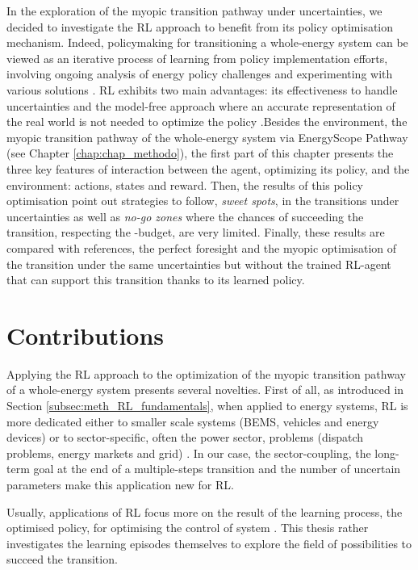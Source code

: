 In the exploration of the myopic transition pathway under uncertainties, we decided to investigate the \gls{RL} approach to benefit from its policy optimisation mechanism. Indeed, policymaking for transitioning a whole-energy system can be viewed as an iterative process of learning from policy implementation efforts, involving ongoing analysis of energy policy challenges and experimenting with various solutions \cite{howlett1995studying}. \gls{RL} exhibits two main advantages: its effectiveness to handle uncertainties and the model-free approach where an accurate representation of the real world is not needed to optimize the policy \cite{perera2021applications}.Besides the environment, \ie the myopic transition pathway of the whole-energy system via EnergyScope Pathway (see Chapter \ref{chap:chap_methodo}), the first part of this chapter presents the three key features of interaction between the agent, optimizing its policy, and the environment: actions, states and reward.  Then, the results of this policy optimisation point out strategies to follow, \ie \textit{sweet spots}, in the transitions under uncertainties as well as \textit{no-go zones} where the chances of succeeding the transition, \ie respecting the -budget, are very limited. Finally, these results are compared with references, \ie the perfect foresight and the myopic optimisation of the transition under the same uncertainties but without the trained \gls{RL}-agent that can support this transition thanks to its learned policy.

\section*{Contributions}
\label{sec:meth:contributions}
Applying the \gls{RL} approach to the optimization of the myopic transition pathway of a whole-energy system presents several novelties. First of all, as introduced in Section \ref{subsec:meth_RL_fundamentals}, when applied to energy systems, \gls{RL} is more dedicated either to smaller scale systems (\eg \gls{BEMS}, vehicles and energy devices) or to sector-specific, often the power sector, problems (\eg dispatch problems, energy markets and grid) \cite{perera2021applications}. In our case, the sector-coupling, the long-term goal at the end of a multiple-steps transition and the number of uncertain parameters make this application new for \gls{RL}.

Usually, applications of \gls{RL} focus more on the result of the learning process, the optimised policy, for optimising the control of system \cite{perera2021applications}. This thesis rather investigates the learning episodes themselves to explore the field of possibilities to succeed the transition.

